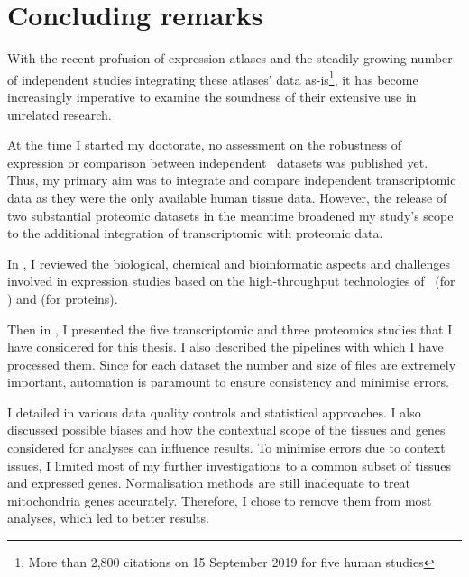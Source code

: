 \chapter{Concluding remarks}\label{ch:conclusion}

\setlength{\epigraphwidth}{0.49\textwidth}%
    \setlength{\epigraphrule}{0pt}%

With the recent profusion of expression atlases
and the steadily growing number of independent studies
integrating these atlases' data as-is\footnote{%
More than 2,800 citations on 15 September 2019 for five human studies},
it has become increasingly imperative to examine
the soundness of their extensive use in unrelated research.

At the time I started my doctorate,
no assessment on the robustness of expression or
comparison between independent \Rnaseq\ datasets was published yet.
Thus,
my primary aim was to integrate and compare independent transcriptomic data
as they were the only available human tissue data.
However, the release of two substantial proteomic datasets in the meantime
broadened my study's scope
to the additional integration of transcriptomic with proteomic data.

In ,
I reviewed the biological, chemical and bioinformatic aspects and challenges
involved in expression studies based on the high-throughput technologies
of \Rnaseq\ (for \mRNAs) and \ms{} (for proteins).

Then in ,
I presented the five transcriptomic and three proteomics studies
that I have considered for this thesis.
I also described the pipelines with which I have processed them.
Since for each dataset the number and size of files are extremely important,
automation is paramount to ensure consistency and minimise errors.\mybr\

I detailed in  various data quality controls
and statistical approaches.
I also discussed possible biases and
how the contextual scope of the tissues and genes considered for analyses
can influence results.
To minimise errors due to context issues,
I limited most of my further investigations to
a common subset of tissues and expressed genes.
Normalisation methods are still inadequate
to treat mitochondria genes accurately.
Therefore, I chose to remove them from most analyses,
which led to better results.


